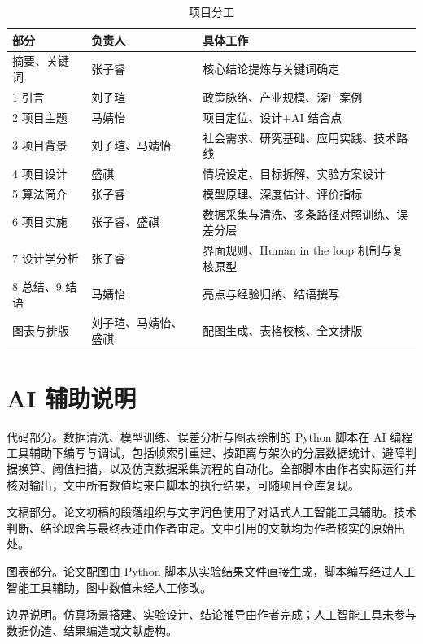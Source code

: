 \documentclass[12pt,a4paper]{ctexart}
\begin{document}
\begin{table}[H]
\centering
\caption{项目分工}
\small
\begin{tabular}{lll}
\toprule
部分 & 负责人 & 具体工作 \\
\midrule
摘要、关键词 & 张子睿 & 核心结论提炼与关键词确定 \\
1 引言 & 刘子瑄 & 政策脉络、产业规模、深广案例 \\
2 项目主题 & 马婧怡 & 项目定位、设计+AI 结合点 \\
3 项目背景 & 刘子瑄、马婧怡 & 社会需求、研究基础、应用实践、技术路线 \\
4 项目设计 & 盛祺 & 情境设定、目标拆解、实验方案设计 \\
5 算法简介 & 张子睿 & 模型原理、深度估计、评价指标 \\
6 项目实施 & 张子睿、盛祺 & 数据采集与清洗、多条路径对照训练、误差分层 \\
7 设计学分析 & 张子睿 & 界面规则、Human in the loop 机制与复核原型 \\
8 总结、9 结语 & 马婧怡 & 亮点与经验归纳、结语撰写 \\
图表与排版 & 刘子瑄、马婧怡、盛祺 & 配图生成、表格校核、全文排版 \\
\bottomrule
\end{tabular}
\end{table}

\section*{AI 辅助说明}

代码部分。数据清洗、模型训练、误差分析与图表绘制的 Python 脚本在 AI 编程工具辅助下编写与调试，包括帧索引重建、按距离与架次的分层数据统计、避障判据换算、阈值扫描，以及仿真数据采集流程的自动化。全部脚本由作者实际运行并核对输出，文中所有数值均来自脚本的执行结果，可随项目仓库复现。

文稿部分。论文初稿的段落组织与文字润色使用了对话式人工智能工具辅助。技术判断、结论取舍与最终表述由作者审定。文中引用的文献均为作者核实的原始出处。

图表部分。论文配图由 Python 脚本从实验结果文件直接生成，脚本编写经过人工智能工具辅助，图中数值未经人工修改。

边界说明。仿真场景搭建、实验设计、结论推导由作者完成；人工智能工具未参与数据伪造、结果编造或文献虚构。
\end{document}
